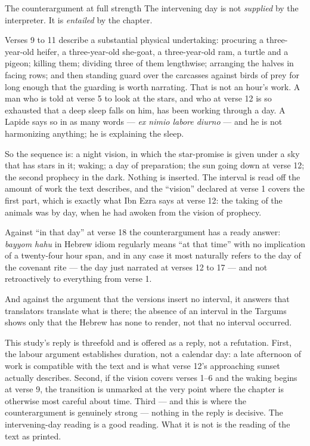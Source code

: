 \begin{studybox}{The counterargument at full strength}
The intervening day is not \emph{supplied} by the interpreter. It is
\emph{entailed} by the chapter.

Verses 9 to 11 describe a substantial physical undertaking: procuring a
three-year-old heifer, a three-year-old she-goat, a three-year-old ram, a turtle
and a pigeon; killing them; dividing three of them lengthwise; arranging the
halves in facing rows; and then standing guard over the carcasses against birds
of prey for long enough that the guarding is worth narrating. That is not an
hour's work. A man who is told at verse 5 to look at the stars, and who at verse
12 is so exhausted that a deep sleep falls on him, has been working through a
day. A Lapide says so in as many words --- \textit{ex nimio labore diurno} ---
and he is not harmonizing anything; he is explaining the sleep.

So the sequence is: a night vision, in which the star-promise is given under a
sky that has stars in it; waking; a day of preparation; the sun going down at
verse 12; the second prophecy in the dark. Nothing is inserted. The interval is
read off the amount of work the text describes, and the ``vision'' declared at
verse 1 covers the first part, which is exactly what Ibn Ezra says at verse 12:
the taking of the animals was by day, when he had awoken from the vision of
prophecy.

Against ``in that day'' at verse 18 the counterargument has a ready answer:
\textit{bayyom hahu} in Hebrew idiom regularly means ``at that time'' with no
implication of a twenty-four hour span, and in any case it most naturally refers
to the day of the covenant rite --- the day just narrated at verses 12 to 17 ---
and not retroactively to everything from verse 1.

And against the argument that the versions insert no interval, it answers that
translators translate what is there; the absence of an interval in the Targums
shows only that the Hebrew has none to render, not that no interval occurred.
\end{studybox}

\noindent This study's reply is threefold and is offered as a reply, not a
refutation. First, the labour argument establishes duration, not a calendar day:
a late afternoon of work is compatible with the text and is what verse 12's
approaching sunset actually describes. Second, if the vision covers verses 1--6
and the waking begins at verse 9, the transition is unmarked at the very point
where the chapter is otherwise most careful about time. Third --- and this is
where the counterargument is genuinely strong --- nothing in the reply is
decisive. The intervening-day reading is a good reading. What it is not is the
reading of the text as printed.

